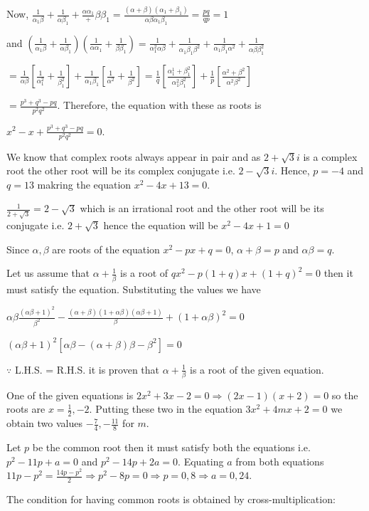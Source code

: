   Now, $\frac{1}{\alpha_1\beta} + \frac{1}{\alpha\beta_1} + \frac{\alpha\alpha_1}+ {\beta\beta_1} =
  \frac{(\alpha + \beta)(\alpha_1 + \beta_1)}{\alpha\beta\alpha_1\beta_1} = \frac{pq}{qp} = 1$

  and $\left(\frac{1}{\alpha_1\beta} + \frac{1}{\alpha\beta_1}\right)\left(\frac{1}{\alpha\alpha_1} +
  \frac{1}{\beta\beta_1}\right) = \frac{1}{\alpha_1^2\alpha\beta} + \frac{1}{\alpha_1\beta_1\beta^2} +
  \frac{1}{\alpha_1\beta_1\alpha^2} + \frac{1}{\alpha\beta\beta_1^2}$

  $= \frac{1}{\alpha\beta}\left[\frac{1}{\alpha_1^2} + \frac{1}{\beta_1^2}\right] +
  \frac{1}{\alpha_1\beta_1}\left[\frac{1}{\alpha^2} + \frac{1}{\beta^2}\right] =
  \frac{1}{q}\left[\frac{\alpha_1^1 + \beta_1^2}{\alpha_1^2\beta_1^2}\right] +
  \frac{1}{p}\left[\frac{\alpha^2 + \beta^2}{\alpha^2\beta^2}\right]$

  $= \frac{p^3 + q^3 - pq}{p^2q^2}$. Therefore, the equation with these as roots is

  $x^2 - x + \frac{p^3 + q^3 - pq}{p^2q^2} = 0$.
\item We know that complex roots always appear in pair and as $2 + \sqrt{3}i$ is a complex root the other
  root will be its complex conjugate i.e. $2 - \sqrt{3}i$. Hence, $p = -4$ and $q = 13$ makring the equation
  $x^2 - 4x + 13 = 0$.
\item $\frac{1}{2 + \sqrt{3}} = 2 - \sqrt{3}$ which is an irrational root and the other root will be its
  conjugate i.e. $2 + \sqrt{3}$ hence the equation will be $x^2 - 4x + 1 = 0$
\item Since $\alpha, \beta$ are roots of the equation $x^2 - px + q = 0$, $\alpha + \beta = p$ and
  $\alpha\beta = q$.

  Let us assume that $\alpha + \frac{1}{\beta}$ is a root of $qx^2 - p(1 + q)x + (1 + q)^2 = 0$ then
  it must satisfy the equation. Substituting the values we have

  $\alpha\beta\frac{(\alpha\beta + 1)^2}{\beta^2} - \frac{(\alpha + \beta)(1 + \alpha\beta)(\alpha\beta +
    1)}{\beta} + (1 + \alpha\beta)^2 = 0$

  $(\alpha\beta + 1)^2[\alpha\beta - (\alpha + \beta)\beta - \beta^2] = 0$

  $\because$ L.H.S. = R.H.S. it is proven that $\alpha + \frac{1}{\beta}$ is a root of the given
  equation.
\item One of the given equations is $2x^2 + 3x - 2 = 0 \Rightarrow (2x - 1)(x + 2) = 0$ so the roots are $x
  = \frac{1}{2}, -2$. Putting these two in the equation $3x^2 + 4mx + 2 = 0$ we obtain two values
  $-\frac{7}{4}, -\frac{11}{8}$ for $m$.
\item Let $p$ be the common root then it must satisfy both the equations i.e. $p^2 - 11p + a = 0$ and $p^2 -
  14p + 2a = 0$. Equating $a$ from both equations $11p - p^2 = \frac{14p - p^2}{2} \Rightarrow p^2 - 8p = 0
  \Rightarrow p = 0, 8\Rightarrow a = 0, 24$.
\item The condition for having common roots is obtained by cross-multiplication:

